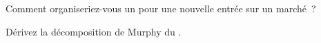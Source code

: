 \begin{interviewq}\label{iq:fm:culture-and-decision-making:5}
Comment organiseriez-vous un  pour une nouvelle entrée sur un marché~?
\end{interviewq}

\begin{interviewq}\label{iq:fm:culture-and-decision-making:6}
Dérivez la décomposition de Murphy du .
\end{interviewq}
